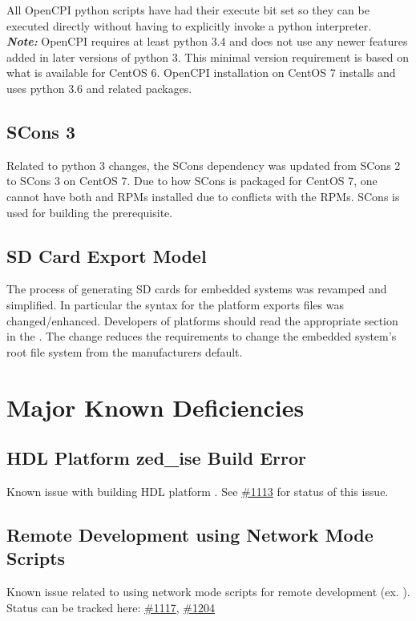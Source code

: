 All OpenCPI python scripts have had their execute bit set so they can be executed directly without having to explicitly invoke a python interpreter.\\

\textit{\textbf{Note:}} OpenCPI requires at least python 3.4 and does not use any newer features added in later versions of python 3. This minimal version requirement is based on what is available for CentOS 6. OpenCPI installation on CentOS 7 installs and uses python 3.6 and related packages.

\subsection{SCons 3}
\label{sec:17_scons3}
Related to python 3 changes, the SCons dependency was updated from SCons 2 to SCons 3 on CentOS 7. Due to how SCons is packaged for CentOS 7, one cannot have both  and  RPMs installed due to conflicts with the RPMs. SCons is used for building the  prerequisite.

\subsection{SD Card Export Model}
\label{sec:17_sd_card}
The process of generating SD cards for embedded systems was revamped and simplified.  In particular the syntax for the platform exports files was changed/enhanced.  Developers of platforms should read the appropriate section in the .  The change reduces the requirements to change the embedded system's root file system from the manufacturers default.

\section{Major Known Deficiencies}
\label{sec:17_bugs}

\subsection{HDL Platform zed\_{}ise Build Error}
\label{bug:1113}
Known issue with building HDL platform . See \href{https://gitlab.com/opencpi/opencpi/-/issues/1113}{\#{}1113} for status of this issue.

\subsection{Remote Development using Network Mode Scripts}
\label{bug:1117}
Known issue related to using network mode scripts for remote development (ex. ). Status can be tracked here: \href{https://gitlab.com/opencpi/opencpi/-/issues/1117}{\#{}1117},  \href{https://gitlab.com/opencpi/opencpi/-/issues/1204}{\#{}1204}

